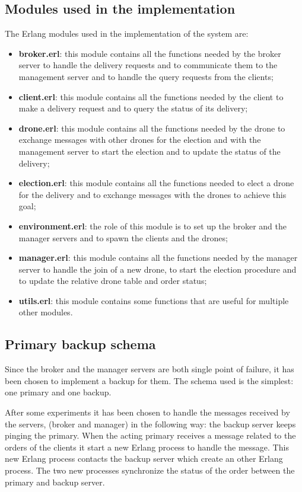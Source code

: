 \documentclass[a4paper, oneside]{memoir}
\begin{document}
\subsection{Modules used in the implementation}
The Erlang modules used in the implementation of the system are:
\begin{itemize}
\item \textbf{broker.erl}: this module contains all the functions needed by the broker server to handle the delivery requests and to communicate them to the management server and to handle the query requests from the clients;
\item \textbf{client.erl}: this module contains all the functions needed by the client to make a delivery request and to query the status of its delivery;
\item \textbf{drone.erl}: this module contains all the functions needed by the drone to exchange messages with other drones for the election and with the management server to start the election and to update the status of the delivery;
\item \textbf{election.erl}: this module contains all the functions needed to elect a drone for the delivery and to exchange messages with the drones to achieve this goal;
\item \textbf{environment.erl}: the role of this module is to set up the broker and the manager servers and to spawn the clients and the drones;
\item \textbf{manager.erl}: this module contains all the functions needed by the manager server to handle the join of a new drone, to start the election procedure and to update the relative drone table and order status;
\item \textbf{utils.erl}: this module contains some functions that are useful for multiple other modules.
\end{itemize}


\subsection{Primary backup schema}
Since the broker and the manager servers are both single point of failure, it has been chosen to implement a backup for them. The schema used is the simplest: one primary and one backup.

After some experiments it has been chosen to handle the messages received by the servers, (broker and manager) in the following way: the backup server keeps pinging the primary. When the acting primary receives a message related to the orders of the clients it start a new Erlang process to handle the message. This new Erlang process contacts the backup server which create an other Erlang process. The two new processes synchronize the status of the order between the primary and backup server.
\end{document}
